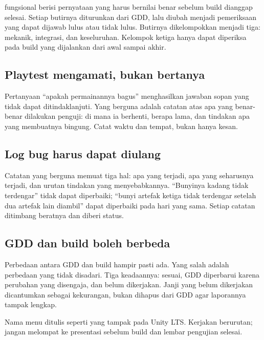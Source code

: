  fungsional berisi pernyataan yang harus bernilai benar
sebelum build dianggap selesai. Setiap butirnya diturunkan dari GDD, lalu
diubah menjadi pemeriksaan yang dapat dijawab lulus atau tidak lulus. Butirnya
dikelompokkan menjadi tiga: mekanik, integrasi, dan keseluruhan. Kelompok
ketiga hanya dapat diperiksa pada build yang dijalankan dari awal sampai akhir.

\subsection*{Playtest mengamati, bukan bertanya}

Pertanyaan ``apakah permainannya bagus'' menghasilkan jawaban sopan yang tidak
dapat ditindaklanjuti. Yang berguna adalah catatan atas apa yang benar-benar
dilakukan penguji: di mana ia berhenti, berapa lama, dan tindakan apa yang
membuatnya bingung. Catat waktu dan tempat, bukan hanya kesan.

\subsection*{Log bug harus dapat diulang}

Catatan yang berguna memuat tiga hal: apa yang terjadi, apa yang seharusnya
terjadi, dan urutan tindakan yang menyebabkannya. ``Bunyinya kadang tidak
terdengar'' tidak dapat diperbaiki; ``bunyi artefak ketiga tidak terdengar
setelah dua artefak lain diambil'' dapat diperbaiki pada hari yang sama.
Setiap catatan ditimbang beratnya dan diberi status.

\subsection*{GDD dan build boleh berbeda}

Perbedaan antara GDD dan build hampir pasti ada. Yang salah adalah perbedaan
yang tidak disadari. Tiga keadaannya: sesuai, GDD diperbarui karena perubahan
yang disengaja, dan belum dikerjakan. Janji yang belum dikerjakan dicantumkan
sebagai kekurangan, bukan dihapus dari GDD agar laporannya tampak lengkap.


Nama menu ditulis seperti yang tampak pada Unity LTS. Kerjakan berurutan;
jangan melompat ke presentasi sebelum build dan lembar pengujian selesai.

